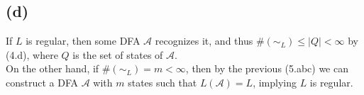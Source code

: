 \documentclass{article}
\begin{document}
        \subsection*{(d)}
            If $L$ is regular, then some DFA $\mathcal{A}$ recognizes it,
            and thus $\#(\sim_L) \leq |Q| < \infty$ by (4.d),
            where $Q$ is the set of states of $\mathcal{A}$. \\
            On the other hand, if $\#(\sim_L) = m < \infty$, then
            by the previous (5.abc) we can construct a DFA $\mathcal{A}$
            with $m$ states such that $L(\mathcal{A}) = L$, implying $L$ is regular.
\end{document}
